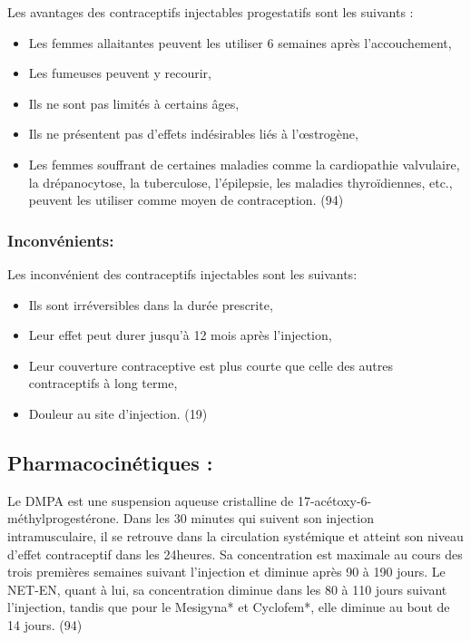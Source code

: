 \noindent Les avantages des contraceptifs injectables progestatifs sont les suivants : 

\begin{itemize}
  \item	Les femmes allaitantes peuvent les utiliser 6 semaines après l’accouchement, 
  \item	Les fumeuses peuvent y recourir, 
  \item	Ils ne sont pas limités à certains âges, 
  \item	Ils ne présentent pas d’effets indésirables liés à l’œstrogène, 
  \item	Les femmes souffrant de certaines maladies comme la cardiopathie valvulaire, la drépanocytose, la tuberculose, l’épilepsie, les maladies thyroïdiennes, etc., peuvent les utiliser comme moyen de contraception. (94)       
\end{itemize}

\subsubsection{Inconvénients: }

Les inconvénient des contraceptifs injectables sont les suivants: 

\begin{itemize}
  \item	Ils sont irréversibles dans la durée prescrite, 
  \item Leur effet peut durer jusqu’à 12 mois après l’injection,
  \item Leur couverture contraceptive est plus courte que celle des autres contraceptifs à long terme, 
  \item	Douleur au site d’injection. (19)
\end{itemize}

\subsection{Pharmacocinétiques :}

Le DMPA est une suspension aqueuse cristalline de 17-acétoxy-6-méthylprogestérone. Dans les 30 minutes qui suivent son injection intramusculaire, il se retrouve dans la circulation systémique et atteint son niveau d’effet contraceptif dans les 24heures. Sa concentration est maximale au cours des trois premières semaines suivant l’injection et diminue après 90 à 190 jours. Le NET-EN, quant à lui, sa concentration diminue dans les 80 à 110 jours suivant l’injection, tandis que pour le Mesigyna* et Cyclofem*, elle diminue au bout de 14 jours. (94)

